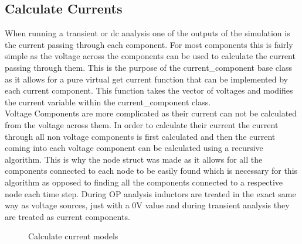\documentclass{article}
\begin{document}
\subsection{Calculate Currents}
When running a transient or dc analysis one of the outputs of the simulation is the current passing through each component. For most components this is fairly simple as the voltage across the components can be used to calculate the current passing through them. This is the purpose of the current\_component base class as it allows for a pure virtual get current function that can be implemented by each current component. This function takes the vector of voltages and modifies the current variable within the current\_component class.\\Voltage Components are more complicated as their current can not be calculated from the voltage across them. In order to calculate their current the current through all non voltage components is first calculated and then the current coming into each voltage component can be calculated using a recursive algorithm. This is why the node struct was made as it allows for all the components connected to each node to be easily found which is necessary for this algorithm as opposed to finding all the components connected to a respective node each time step. During OP analysis inductors are treated in the exact same way as voltage sources, just with a 0V value and during transient analysis they are treated as current components.\\ 
\begin{figure}[h]%
    \centering
    \qquad
    \caption{Calculate current models}%
    \label{fig:CalculateCurrent}%
\end{figure}
\end{document}
